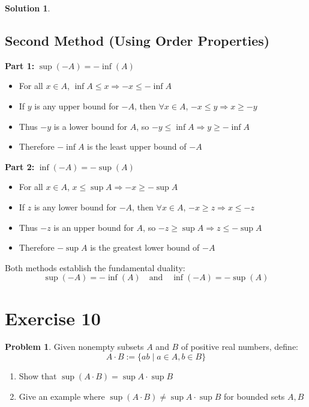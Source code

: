 \documentclass{article}
\theoremstyle{definition}
\newtheorem{problem}{Problem}
\newtheorem*{solution}{Solution}
\begin{document}
\begin{solution}
\subsection*{Second Method (Using Order Properties)}

\textbf{Part 1:} $\sup(-A) = -\inf(A)$

\begin{itemize}
    \item For all $x \in A$, $\inf A \leq x \Rightarrow -x \leq -\inf A$
    \item If $y$ is any upper bound for $-A$, then $\forall x \in A$, $-x \leq y \Rightarrow x \geq -y$
    \item Thus $-y$ is a lower bound for $A$, so $-y \leq \inf A \Rightarrow y \geq -\inf A$
    \item Therefore $-\inf A$ is the least upper bound of $-A$
\end{itemize}

\textbf{Part 2:} $\inf(-A) = -\sup(A)$

\begin{itemize}
    \item For all $x \in A$, $x \leq \sup A \Rightarrow -x \geq -\sup A$
    \item If $z$ is any lower bound for $-A$, then $\forall x \in A$, $-x \geq z \Rightarrow x \leq -z$
    \item Thus $-z$ is an upper bound for $A$, so $-z \geq \sup A \Rightarrow z \leq -\sup A$
    \item Therefore $-\sup A$ is the greatest lower bound of $-A$
\end{itemize}

\vspace{0.3cm}
Both methods establish the fundamental duality:
\[
\boxed{\sup(-A) = -\inf(A)} \quad \text{and} \quad \boxed{\inf(-A) = -\sup(A)}
\]
\end{solution}


\section*{Exercise 10}

\begin{problem}
Given nonempty subsets \( A \) and \( B \) of positive real numbers, define:
\[
A \cdot B := \{ab \mid a \in A, b \in B\}
\]
\begin{enumerate}[label=(\alph*)]
    \item Show that \(\sup(A \cdot B) = \sup A \cdot \sup B\)
    \item Give an example where \(\sup(A \cdot B) \neq \sup A \cdot \sup B\) for bounded sets \(A,B\)
\end{enumerate}
\end{problem}
\end{document}
